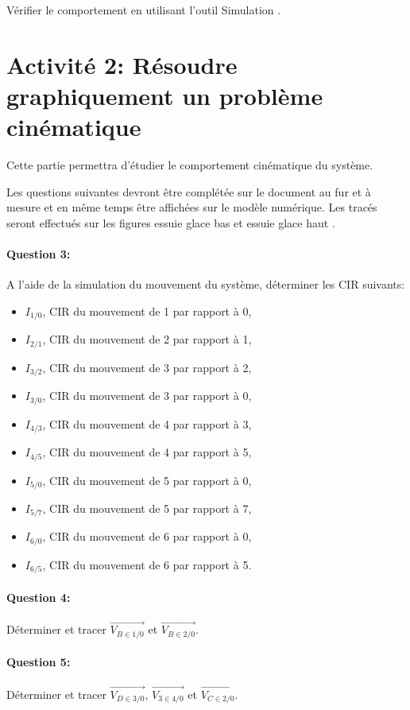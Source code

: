 \reponse[1]

Vérifier le comportement en utilisant l'outil \og Simulation \fg.

\section{Activité 2: Résoudre graphiquement un problème cinématique}

Cette partie permettra d'étudier le comportement cinématique du système.

Les questions suivantes devront être complétée sur le document au fur et à mesure et en même temps être affichées sur le modèle numérique. Les tracés seront effectués sur les figures \og essuie glace bas \fg et \og essuie glace haut \fg.

\paragraph{Question 3:} A l'aide de la simulation du mouvement du système, déterminer les CIR suivants:
\begin{itemize}
 \item $I_{1/0}$, CIR du mouvement de 1 par rapport à 0,
 \item $I_{2/1}$, CIR du mouvement de 2 par rapport à 1,
 \item $I_{3/2}$, CIR du mouvement de 3 par rapport à 2,
 \item $I_{3/0}$, CIR du mouvement de 3 par rapport à 0,
 \item $I_{4/3}$, CIR du mouvement de 4 par rapport à 3,
 \item $I_{4/5}$, CIR du mouvement de 4 par rapport à 5,
 \item $I_{5/0}$, CIR du mouvement de 5 par rapport à 0,
 \item $I_{5/7}$, CIR du mouvement de 5 par rapport à 7,
 \item $I_{6/0}$, CIR du mouvement de 6 par rapport à 0,
 \item $I_{6/5}$, CIR du mouvement de 6 par rapport à 5.
\end{itemize}

\paragraph{Question 4:} Déterminer et tracer $\overrightarrow{V_{B\in 1/0}}$ et $\overrightarrow{V_{B\in 2/0}}$.

\reponse[1]

\paragraph{Question 5:} Déterminer et tracer $\overrightarrow{V_{D\in 3/0}}$, $\overrightarrow{V_{3\in 4/0}}$ et $\overrightarrow{V_{C\in 2/0}}$.


